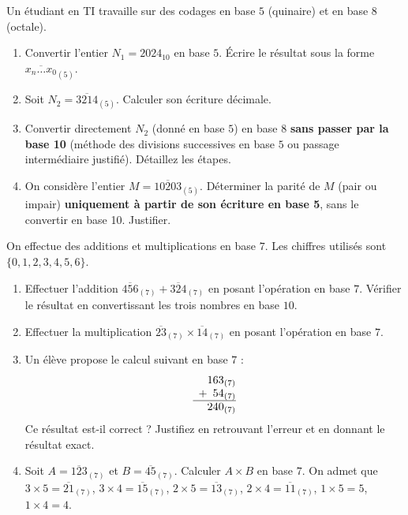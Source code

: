 \documentclass[11pt]{article}
\begin{document}
\begin{exercice}
Un étudiant en TI travaille sur des codages en base $5$ (quinaire) et en base $8$ (octale).
\begin{enumerate}
    \item Convertir l'entier $N_1 = \num{2024}_{10}$ en base $5$. Écrire le résultat sous la forme $\overline{x_n \dots x_0}_{(5)}$.
    \item Soit $N_2 = \overline{3214}_{(5)}$. Calculer son écriture décimale.
    \item Convertir directement $N_2$ (donné en base $5$) en base $8$ \textbf{sans passer par la base 10} (méthode des divisions successives en base $5$ ou passage intermédiaire justifié). Détaillez les étapes.
    \item On considère l'entier $M = \overline{10203}_{(5)}$. Déterminer la parité de $M$ (pair ou impair) \textbf{uniquement à partir de son écriture en base 5}, sans le convertir en base 10. Justifier.
\end{enumerate}
\end{exercice}

\begin{exercice}
On effectue des additions et multiplications en base $7$. Les chiffres utilisés sont $\{0,1,2,3,4,5,6\}$.
\begin{enumerate}
    \item Effectuer l'addition $\overline{456}_{(7)} + \overline{324}_{(7)}$ en posant l'opération en base $7$. Vérifier le résultat en convertissant les trois nombres en base $10$.
    \item Effectuer la multiplication $\overline{23}_{(7)} \times \overline{14}_{(7)}$ en posant l'opération en base $7$.
    \item Un élève propose le calcul suivant en base $7$ :
    \[
    \begin{array}{r@{}c@{}c@{}c@{}c}
      & 1 & 6 & 3_{(7)} \\
    + &   & 5 & 4_{(7)} \\
    \hline
      & 2 & 4 & 0_{(7)}
    \end{array}
    \]
    Ce résultat est-il correct ? Justifiez en retrouvant l'erreur et en donnant le résultat exact.
    \item Soit $A = \overline{123}_{(7)}$ et $B = \overline{45}_{(7)}$. Calculer $A \times B$ en base $7$. On admet que $3 \times 5 = \overline{21}_{(7)}$, $3 \times 4 = \overline{15}_{(7)}$, $2 \times 5 = \overline{13}_{(7)}$, $2 \times 4 = \overline{11}_{(7)}$, $1 \times 5 = 5$, $1 \times 4 = 4$.
\end{enumerate}
\end{exercice}
\end{document}

